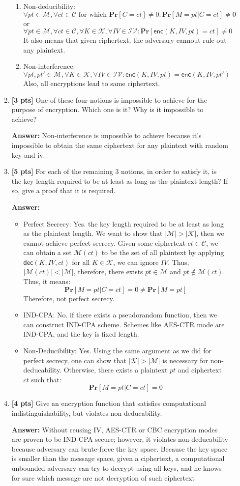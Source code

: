 \documentclass[11pt]{article}
\renewcommand{\Pr}{\ensuremath{\mathbf{Pr}}\xspace}
\newcommand{\ans}[1]{\begin{mdframed}\textbf{Answer: }#1\end{mdframed}}
\begin{document}
\begin{description}
\begin{enumerate}
{\begin{enumerate}
    \item Non-deducibility:
    $$\forall pt \in \mathcal{M}, \forall ct \in \mathcal{C}\text{ for which }\Pr[C = ct]\neq 0: \Pr[M = pt | C = ct] \neq 0$$
    or
    $$\forall pt \in \mathcal{M}, \forall ct \in \mathcal{C},\forall K \in \mathcal{K},\forall IV \in  \mathcal{IV}: \Pr[\mathsf{enc}(K,IV,pt)=ct] \neq 0$$
    It also means that given ciphertext, the adversary cannout rule out any plaintext.
    \item Non-interference:
    $$\forall pt,pt' \in \mathcal{M}, \forall K \in \mathcal{K},\forall IV \in  \mathcal{IV}: \mathsf{enc}(K,IV,pt) =\mathsf{enc}(K,IV,pt')$$
    Also, all encryptions lead to same ciphertext.
  \end{enumerate}
}
 \item \textbf{[3 pts]}
One of these four notions is impossible to achieve for the purpose of encryption.  Which one is it?  Why is it impossible to achieve?
\ans{
  Non-interference is impossible to achieve because it's impossible to obtain the same ciphertext for any plaintext with random key and iv.
}
 \item \textbf{[5 pts]}
For each of the remaining $3$ notions, in order to satisfy it, is the key length required to be at least as long as the plaintext length?  If so, give a proof that it is required.
\ans{
  \begin{itemize}
     \item Perfect Secrecy: Yes. the key length required to be at least as long as the plaintext length. We want to show that $|\mathcal{M}| > |\mathcal{K}|$, then we cannot achieve perfect secrecy. Given some ciphertext $ct\in \mathcal C$, we can obtain a set $\mathcal{M}(ct)$ to be the set of all plaintext by applying $\mathsf{dec}(K,IV,ct)$ for all $K\in \mathcal K$, we can ignore $IV$. Thus, $|\mathcal{M}(ct)| < |\mathcal M|$, therefore, there exists $pt \in \mathcal M$ and $pt\notin \mathcal{M}(ct)$. Thus, it means:
     $$\Pr[M = pt|C =ct] = 0 \neq \Pr[M = pt]$$
     Therefore, not perfect secrecy.
     \item IND-CPA: No. if there exists a pseudorandom function, then we can construct IND-CPA scheme. Schemes like AES-CTR mode are IND-CPA, and the key is fixed length.
     \item Non-Deducibility: Yes. Using the same argument as we did for perfect secrecy, one can show that $|\mathcal K| > |\mathcal M|$ is necessary for non-deducability. Otherwise, there exists a plaintext $pt$ and ciphertext $ct$ such that:
     $$\Pr[M = pt|C =ct] = 0$$ 
   \end{itemize} 
}
 \item \textbf{[4 pts]}
Give an encryption function that satisfies computational indistinguishability, but violates non-deducability.
\ans{
  Without reusing IV, AES-CTR or CBC encryption modes are proven to be IND-CPA secure; however, it violates non-deducability because adversary can brute-force the key space. Because the key space is smaller than the message space, given a ciphertext, a computational unbounded adversary can try to decrypt using all keys, and he knows for sure which message are not decryption of such ciphertext
}


\end{enumerate}
\end{description}
\end{document}
